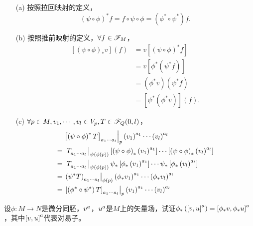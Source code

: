 \begin{xiti}
	\begin{zm}
		\begin{enumerate}
			\item[(a)] 按照拉回映射的定义，
			\begin{displaymath}
			\left( \psi \circ \phi \right)^* f= f \circ \psi \circ \phi = \left( \phi^* \circ \psi^*\right) f.
			\end{displaymath}
			\item[(b)] 按照推前映射的定义，$\forall f\in \mathscr{F}_M $，
			\begin{align*}
			\left[\left(\psi\circ\phi\right)_* v \right] (f) &= v \left[ \left( \psi \circ \phi \right)^* f \right]\\
			&= v \left[\phi^*\left( \psi^* f \right) \right]\\
			&= \left( \phi^* v \right) \left( \psi^* f \right)\\
			&= \left[ \psi^* \left(\phi^* v\right) \right] (f).
			\end{align*}
			\item[(c)] $\forall p\in M, v_1,\cdots,v_l \in V_p ,T\in \mathscr{F}_Q(0,l)$，
			\begin{align*}
			&\left. \tensor{\left[\left(\psi\circ\phi\right)^* T\right]  }{_{a_1\cdots a_l}} \right|_p \tensor{\left(v_1\right)}{^{a_1}} \cdots \tensor{\left(v_l\right)}{^{a_l}}\\
			=&\; \left. \tensor{T}{_{a_1 \cdots a_l}} \right|_{\psi(\phi(p))} \left[\left(\psi\circ\phi \right)_* \tensor{\left(v_1\right)}{^{a_1}}\right] \cdots \left[\left(\psi\circ\phi \right)_* \tensor{\left(v_l\right)}{^{a_l}}\right]\\
			=&\; \left. \tensor{T}{_{a_1 \cdots a_l}} \right|_{\psi(\phi(p))} \psi_* \left[\phi_* \tensor{\left(v_1\right)}{^{a_1}}\right] \cdots \psi_* \left[\phi_* \tensor{\left(v_l\right)}{^{a_l}}\right]\\
			=&\tmu \left. \tensor{\left( \psi^* T \right)}{_{a_1\cdots a_l}} \right|_{\phi(p)} \tensor{\left( \phi_* v_1 \right)}{^{a_1}} \cdots \tensor{\left( \phi_* v_l \right)}{^{a_l}}\\
			=&\tmu \left. \tensor{\left[\left( \phi^* \circ \psi^* \right) T\right]  }{_{a_1\cdots a_l}} \right|_p \tensor{\left(v_1\right)}{^{a_1}} \cdots \tensor{\left(v_l\right)}{^{a_l}}
			\end{align*}
		\end{enumerate}
	\end{zm}

	\item 设$\phi\colon M \rightarrow N $是微分同胚，$\tensor{v}{^a}$，$\tensor{u}{^a}$是$M$上的矢量场，试证$\phi_*\left( \tensor{\left[ v,u \right]}{^a} \right)= \tensor{\left[\phi_* v,\phi_* u \right]}{^a}$，其中$\tensor{\left[v,u \right]}{^a}$代表对易子。


\end{xiti}
